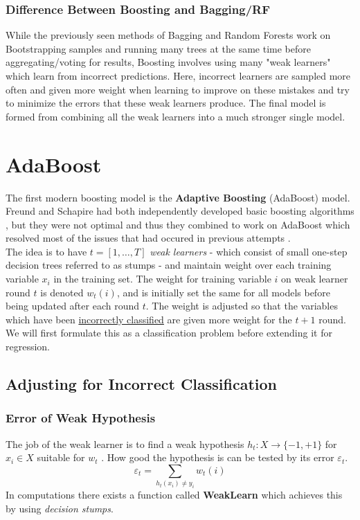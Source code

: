 \documentclass[11pt,a4paper]{report}
\begin{document}
\subsubsection{Difference Between Boosting and Bagging/RF}
While the previously seen methods of Bagging and Random Forests work on Bootstrapping samples and running many trees at the same time before aggregating/voting for results, Boosting involves using many "weak learners" which learn from incorrect predictions. 
Here, incorrect learners are sampled more often and given more weight when learning to improve on these mistakes and try to minimize the errors that these weak learners produce.
The final model is formed from combining all the weak learners into a much stronger single model.


\section{AdaBoost}
The first modern boosting model is the \textbf{Adaptive Boosting} (AdaBoost) model. Freund and Schapire had both independently developed basic boosting algorithms , but they were not optimal and thus they combined to work on AdaBoost which resolved most of the issues that had occured in previous attempts \cite{adaboost}.
\medskip\\
The idea \cite{adasummary} is to have $t = [1,\dots,T]$ \textit{weak learners} - which consist of small one-step decision trees referred to as stumps - and maintain weight over each training variable $x_i$ in the training set.
The weight for training variable $i$ on weak learner round $t$ is denoted $w_t (i)$, and is initially set the same for all models before being updated after each round $t$. The weight is adjusted so that the variables which have been {\color{red} \underline{incorrectly classified}} are given more weight for the $t+1$ round. We will first formulate this as a classification problem before extending it for regression.

\subsection{Adjusting for Incorrect Classification}

\subsubsection{Error of Weak Hypothesis}
The job of the weak learner is to find a weak hypothesis $h_t : X \rightarrow \{-1,+1\}$ for $x_i \in X$ suitable for $w_t$ \cite{adasummary}. How good the hypothesis is can be tested by its error $\varepsilon_t$.
\begin{equation}
   \varepsilon_t = \sum_{h_t (x_i) \neq y_i} w_t (i) 
\end{equation}
In computations there exists a function called \textbf{WeakLearn} which achieves this by using \textit{decision stumps}.
\end{document}

